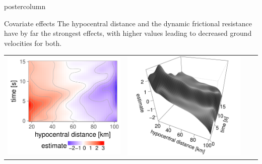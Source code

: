 \documentclass[final,hyperref={pdfpagelabels=false}]{beamer}
\newcommand*\circled[1]{\tikz[baseline=(char.base)]{
\node[shape=circle,draw,inner sep=2pt] (char) {#1};}}
\begin{document}
\begin{frame}
\begin{columns}
\begin{column}{1\textwidth}
\begin{columns}[T]
\begin{column}{.484\textwidth}
\begin{beamercolorbox}[center,wd=\textwidth]{postercolumn}
\begin{minipage}[T]{.95\textwidth}
\begin{block}{\footnotesize \circled{2} Covariate effects}
The hypocentral distance and the dynamic frictional resistance have by far the strongest effects, with higher values leading to decreased ground velocities for both.
\\[5.0ex]
\begin{tabularx}{.95\textwidth}{ZZZ!{\color{LMUdarkgray}\vrule{}}Z}
\includegraphics[width=.9\linewidth]{figures/Effekte_hypoDis1.pdf}
&
\includegraphics[width=.9\linewidth]{figures/Effekte_hypoDis2.pdf}

\end{tabularx}
\end{block}
\end{minipage}
\end{beamercolorbox}
\end{column}
\end{columns}
\end{column}
\end{columns}
\end{frame}
\end{document}
